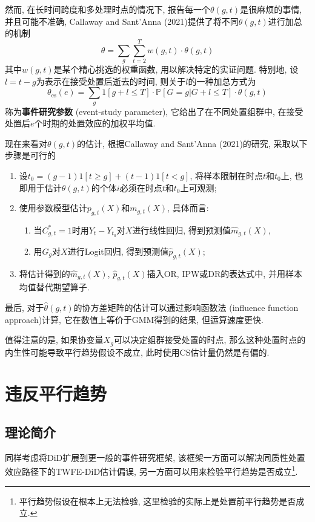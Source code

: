 \documentclass[cn,sakura,14pt,screen,bibstyle=gb7714-2015,math=mtpro2]{elegantnote}
\begin{document}
然而, 在长时间跨度和多处理时点的情况下, 报告每一个$\theta(g,t)$是很麻烦的事情, 并且可能不准确, Callaway and Sant'Anna (2021)提供了将不同$\theta(g,t)$进行加总的机制
$$\theta=\sum_g\sum_{t=2}^Tw(g,t)\cdot\theta(g,t)$$
其中$w(g,t)$是某个精心挑选的权重函数, 用以解决特定的实证问题. 特别地, 设$l=t-g$为表示在接受处置后逝去的时间, 则关于$l$的一种加总方式为
$$\theta_{\text{es}}(e)=\sum_g1[g+l\leq T]\cdot\mathbb{P}[G=g|G+l\leq T]\cdot\theta(g,t)$$
称为\textbf{事件研究参数} (event-study parameter), 它给出了在不同处置组群中, 在接受处置后$e$个时期的处置效应的加权平均值.

现在来看对$\theta(g,t)$的估计, 根据Callaway and Sant'Anna (2021)的研究, 采取以下步骤是可行的
\begin{enumerate}[label=\arabic*.]
  \item 设$t_0=(g-1)1[t\ge g]+(t-1)1[t<g]$, 将样本限制在时点$t$和$t_0$上, 也即用于估计$\theta(g,t)$的个体$i$必须在时点$t$和$t_0$上可观测;
  \item 使用参数模型估计$p_{g,t}(X)$和$m_{g,t}(X)$, 具体而言:
  \begin{enumerate}[label=\alph*.]
    \item 当$C_{g,t}^\ast=1$时用$Y_{t}-Y_{t_0}$对$X$进行线性回归, 得到预测值$\hat{m}_{g,t}(X)$,
    \item 用$G_g$对$X$进行Logit回归, 得到预测值$\hat{p}_{g,t}(X)$;
  \end{enumerate}
  \item 将估计得到的$\hat{m}_{g,t}(X)$, $\hat{p}_{g,t}(X)$插入OR, IPW或DR的表达式中, 并用样本均值替代期望算子.
\end{enumerate}
最后, 对于$\hat{\theta}(g,t)$的协方差矩阵的估计可以通过影响函数法 (influence function approach)计算, 它在数值上等价于GMM得到的结果, 但运算速度更快.

值得注意的是, 如果协变量$X_g$可以决定组群接受处置的时点, 那么这种处置时点的内生性可能导致平行趋势假设不成立, 此时使用CS估计量仍然是有偏的.

\newpage
\section{违反平行趋势}
\subsection{理论简介}
同样考虑将DiD扩展到更一般的事件研究框架, 该框架一方面可以解决同质性处置效应路径下的TWFE-DiD估计偏误, 另一方面可以用来检验平行趋势是否成立\footnote{平行趋势假设在根本上无法检验, 这里检验的实际上是处置前平行趋势是否成立.}.
\end{document}
